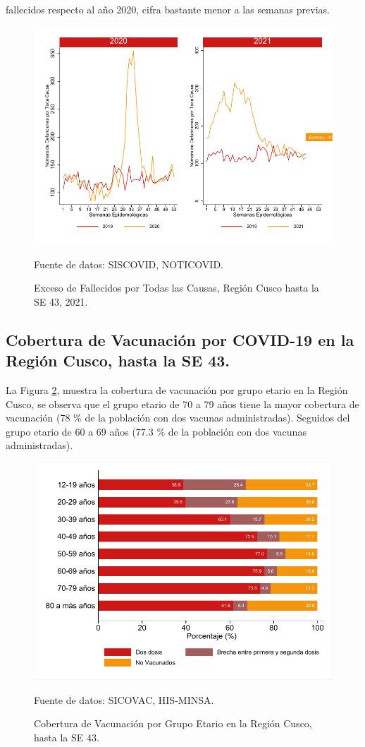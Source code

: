 \documentclass[12pt,a4paper,openany]{book}
\begin{document}
	 fallecidos respecto al año 2020, cifra bastante menor a las semanas previas.

	\begin{figure}[h]
	\caption{Exceso de Fallecidos por  Todas las Causas, Región Cusco hasta la SE 43, 2021.}\label{fig:exceso_regional}
	\begin{center}
		\includegraphics[width=0.65\linewidth]{../figuras/exceso_region.pdf}
	\end{center}
	{\footnotesize {Fuente de datos: SISCOVID, NOTICOVID.}}
	\end{figure}
\clearpage

	\subsection*{Cobertura de Vacunación por COVID-19 en la Región Cusco, hasta la SE 43.}
\noindent La Figura \ref{fig:vacuna_edad}, muestra la cobertura de vacunación por grupo etario en la Región Cusco, se observa que el grupo etario de 70 a 79 años tiene la mayor cobertura de vacunación (78 $\%$ de la población con dos vacunas administradas). Seguidos del grupo etario de 60 a 69 años (77.3 $\%$ de la población con dos vacunas administradas). 

\begin{figure}[h]
	\caption{Cobertura de Vacunación por Grupo Etario en la Región Cusco, hasta la SE 43. }\label{fig:vacuna_edad}
	\begin{center}
		\includegraphics[width=0.65\linewidth]{../figuras/vacunacion_grupo_edad.pdf}
	\end{center}
	{\footnotesize {Fuente de datos: SICOVAC, HIS-MINSA.}}
\end{figure}
\end{document}

